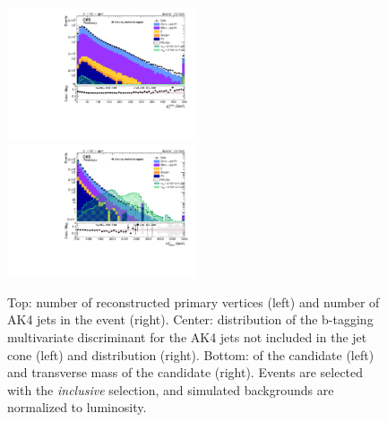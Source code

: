 \begin{figure}[!htb]
\begin{center}
    \includegraphics[width=0.495\textwidth]{plots/v9_U/XVZnnInc/X_pt.pdf}
    \includegraphics[width=0.495\textwidth]{plots/v9_U/XVZnnInc/X_tmass.pdf}

    \caption{Top: number of reconstructed primary vertices (left) and number of AK4 jets in the event (right). Center: distribution of the b-tagging multivariate discriminant for the AK4 jets not included in the \V jet cone (left) and \MET distribution (right). Bottom: \pt of the \VZ candidate (left) and transverse mass of the \VZ candidate (right). Events are selected with the \emph{inclusive} selection, and simulated backgrounds are normalized to luminosity.}
  \end{center}
\end{figure}


